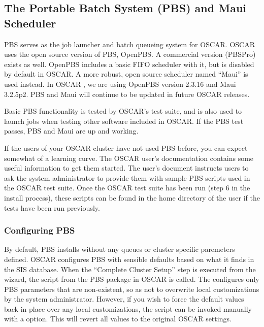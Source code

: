 %
%
%

\subsection{The Portable Batch System (PBS) and Maui Scheduler}
\label{app:pbs-overview}

PBS serves as the job launcher and batch queueing system for OSCAR.
OSCAR uses the open source version of PBS, OpenPBS.  A commercial
version (PBSPro) exists as well.  OpenPBS includes a basic FIFO
scheduler with it, but is disabled by default in OSCAR.  A more
robust, open source scheduler named ``Maui'' is used instead.  In
OSCAR \oscarversion, we are using OpenPBS version 2.3.16 and Maui
3.2.5p2.  PBS and Maui will continue to be updated in future OSCAR
releases.

Basic PBS functionality is tested by OSCAR's test suite, and is also
used to launch jobs when testing other software included in OSCAR.  If
the PBS test passes, PBS and Maui are up and working.  

If the users of your OSCAR cluster have not used PBS before, you can
expect somewhat of a learning curve.  The OSCAR user's documentation
contains some useful information to get them started.  The user's
document instructs users to ask the system administrator to provide
them with sample PBS scripts used in the OSCAR test suite.  Once the
OSCAR test suite has been run (step 6 in the install process), these
scripts can be found in the home directory of the  user
if the tests have been run previously.

\subsubsection{Configuring PBS}

By default, PBS installs without any queues or cluster specific
paremeters defined.  OSCAR configures PBS with sensible defaults based
on what it finds in the SIS database.  When the ``Complete Cluster
Setup'' step is executed from the wizard, the 
script from the PBS package in OSCAR is called.  The
 configures only PBS parameters that are
non-existent, so as not to overwrite local customizations by the
system administrator.  However, if you wish to force the default
values back in place over any local customizations, the
 script can be invoked manually with a
 option.  This will revert all values to the original
OSCAR settings.


